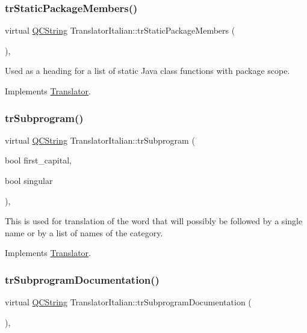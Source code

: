 \subsubsection{\texorpdfstring{trStaticPackageMembers()}{trStaticPackageMembers()}}
{\footnotesize\ttfamily virtual \mbox{\hyperlink{class_q_c_string}{Q\+C\+String}} Translator\+Italian\+::tr\+Static\+Package\+Members (\begin{DoxyParamCaption}{ }\end{DoxyParamCaption})\hspace{0.3cm}{\ttfamily [inline]}, {\ttfamily [virtual]}}

Used as a heading for a list of static Java class functions with package scope. 

Implements \mbox{\hyperlink{class_translator}{Translator}}.

\mbox{\label{class_translator_italian_ad964d826780fc1c39d0235a96b1a8544}} 
\subsubsection{\texorpdfstring{trSubprogram()}{trSubprogram()}}
{\footnotesize\ttfamily virtual \mbox{\hyperlink{class_q_c_string}{Q\+C\+String}} Translator\+Italian\+::tr\+Subprogram (\begin{DoxyParamCaption}\item[{bool}]{first\+\_\+capital,  }\item[{bool}]{singular }\end{DoxyParamCaption})\hspace{0.3cm}{\ttfamily [inline]}, {\ttfamily [virtual]}}

This is used for translation of the word that will possibly be followed by a single name or by a list of names of the category. 

Implements \mbox{\hyperlink{class_translator}{Translator}}.

\mbox{\label{class_translator_italian_a86f2b4671d62eb9dd5f1ab918bffb08c}} 
\subsubsection{\texorpdfstring{trSubprogramDocumentation()}{trSubprogramDocumentation()}}
{\footnotesize\ttfamily virtual \mbox{\hyperlink{class_q_c_string}{Q\+C\+String}} Translator\+Italian\+::tr\+Subprogram\+Documentation (\begin{DoxyParamCaption}{ }\end{DoxyParamCaption})\hspace{0.3cm}{\ttfamily [inline]}, {\ttfamily [virtual]}}

